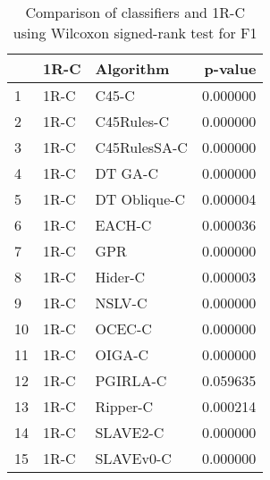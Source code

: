 \begin{table}
\footnotesize
\caption{Comparison of classifiers and 1R-C using Wilcoxon signed-rank test for F1}
\label{tab:1R-C wilcoxon F1 comparison}
\begin{tabular}{lllr}
\hline
 & 1R-C & Algorithm & p-value \\
\hline
1 & 1R-C & C45-C & 0.000000 \\
2 & 1R-C & C45Rules-C & 0.000000 \\
3 & 1R-C & C45RulesSA-C & 0.000000 \\
4 & 1R-C & DT GA-C & 0.000000 \\
5 & 1R-C & DT Oblique-C & 0.000004 \\
6 & 1R-C & EACH-C & 0.000036 \\
7 & 1R-C & GPR & 0.000000 \\
8 & 1R-C & Hider-C & 0.000003 \\
9 & 1R-C & NSLV-C & 0.000000 \\
10 & 1R-C & OCEC-C & 0.000000 \\
11 & 1R-C & OIGA-C & 0.000000 \\
12 & 1R-C & PGIRLA-C & 0.059635 \\
13 & 1R-C & Ripper-C & 0.000214 \\
14 & 1R-C & SLAVE2-C & 0.000000 \\
15 & 1R-C & SLAVEv0-C & 0.000000 \\
\hline
\end{tabular}
\end{table}
